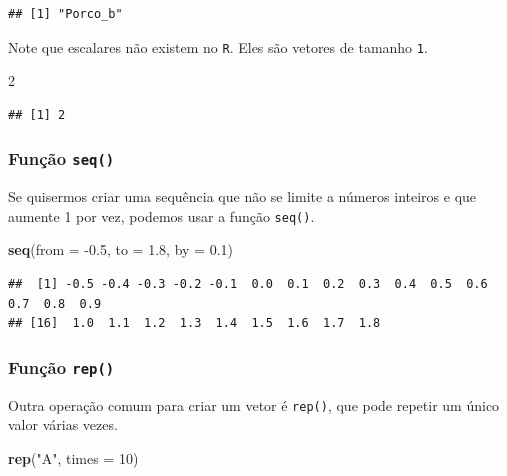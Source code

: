 \documentclass[
]{book}
\newenvironment{Shaded}{\begin{snugshade}}{\end{snugshade}}
\newcommand{\DataTypeTok}[1]{\textcolor[rgb]{0.13,0.29,0.53}{#1}}
\newcommand{\DecValTok}[1]{\textcolor[rgb]{0.00,0.00,0.81}{#1}}
\newcommand{\FloatTok}[1]{\textcolor[rgb]{0.00,0.00,0.81}{#1}}
\newcommand{\KeywordTok}[1]{\textcolor[rgb]{0.13,0.29,0.53}{\textbf{#1}}}
\newcommand{\NormalTok}[1]{#1}
\newcommand{\StringTok}[1]{\textcolor[rgb]{0.31,0.60,0.02}{#1}}
\theoremstyle{definition}
\theoremstyle{definition}
\theoremstyle{definition}
\theoremstyle{remark}
\begin{document}
\begin{verbatim}
## [1] "Porco_b"
\end{verbatim}

Note que escalares não existem no \texttt{R}. Eles são vetores de tamanho \texttt{1}.

\begin{Shaded}
\begin{Highlighting}[]
\DecValTok{2}
\end{Highlighting}
\end{Shaded}

\begin{verbatim}
## [1] 2
\end{verbatim}

\hypertarget{funuxe7uxe3o-seq}{%
\subsubsection{\texorpdfstring{Função \texttt{seq()}}{Função seq()}}\label{funuxe7uxe3o-seq}}

Se quisermos criar uma sequência que não se limite a números inteiros e que aumente 1 por vez, podemos usar a função \texttt{seq()}.

\begin{Shaded}
\begin{Highlighting}[]
\KeywordTok{seq}\NormalTok{(}\DataTypeTok{from =} \FloatTok{-0.5}\NormalTok{, }\DataTypeTok{to =} \FloatTok{1.8}\NormalTok{, }\DataTypeTok{by =} \FloatTok{0.1}\NormalTok{)}
\end{Highlighting}
\end{Shaded}

\begin{verbatim}
##  [1] -0.5 -0.4 -0.3 -0.2 -0.1  0.0  0.1  0.2  0.3  0.4  0.5  0.6  0.7  0.8  0.9
## [16]  1.0  1.1  1.2  1.3  1.4  1.5  1.6  1.7  1.8
\end{verbatim}

\hypertarget{funuxe7uxe3o-rep}{%
\subsubsection{\texorpdfstring{Função \texttt{rep()}}{Função rep()}}\label{funuxe7uxe3o-rep}}

Outra operação comum para criar um vetor é \texttt{rep()}, que pode repetir um único valor várias vezes.

\begin{Shaded}
\begin{Highlighting}[]
\KeywordTok{rep}\NormalTok{(}\StringTok{"A"}\NormalTok{, }\DataTypeTok{times =} \DecValTok{10}\NormalTok{)}
\end{Highlighting}
\end{Shaded}
\end{document}
